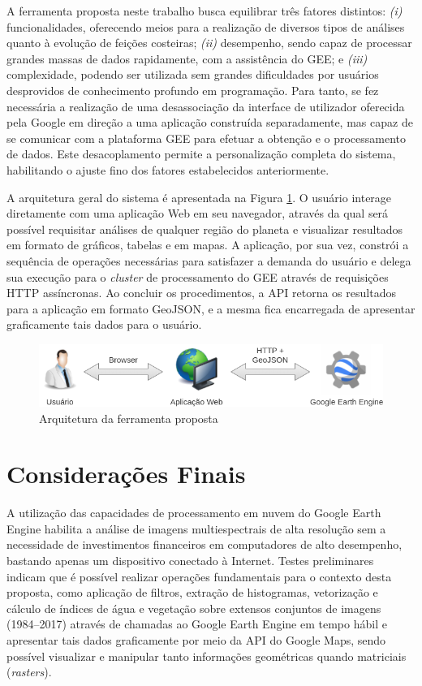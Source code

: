 \documentclass[12pt]{article}
\begin{document}
A ferramenta proposta neste trabalho busca equilibrar três fatores distintos: \textit{(i)} funcionalidades, oferecendo meios para a realização de diversos tipos de análises quanto à evolução de feições costeiras; \textit{(ii)} desempenho, sendo capaz de processar grandes massas de dados rapidamente, com a assistência do GEE; e \textit{(iii)} complexidade, podendo ser utilizada sem grandes dificuldades por usuários desprovidos de conhecimento profundo em programação. Para tanto, se fez necessária a realização de uma desassociação da interface de utilizador oferecida pela Google em direção a uma aplicação construída separadamente, mas capaz de se comunicar com a plataforma GEE para efetuar a obtenção e o processamento de dados. Este desacoplamento permite a personalização completa do sistema, habilitando o ajuste fino dos fatores estabelecidos anteriormente.

A arquitetura geral do sistema é apresentada na Figura \ref{fig:arch}. O usuário interage diretamente com uma aplicação Web em seu navegador, através da qual será possível requisitar análises de qualquer região do planeta e visualizar resultados em formato de gráficos, tabelas e em mapas. A aplicação, por sua vez, constrói a sequência de operações necessárias para satisfazer a demanda do usuário e delega sua execução para o \textit{cluster} de processamento do GEE através de requisições HTTP assíncronas. Ao concluir os procedimentos, a API retorna os resultados para a aplicação em formato GeoJSON, e a mesma fica encarregada de apresentar graficamente tais dados para o usuário.

\begin{figure}[ht]
  \vspace{0.1cm}
  \centering
  \includegraphics[width=.64\textwidth]{cassie.png}
  \vspace{0.05cm}
  \caption{Arquitetura da ferramenta proposta}
  \label{fig:arch}
\end{figure}

\section{Considerações Finais} \label{sec:discussion}

A utilização das capacidades de processamento em nuvem do Google Earth Engine habilita a análise de imagens multiespectrais de alta resolução sem a necessidade de investimentos financeiros em computadores de alto desempenho, bastando apenas um dispositivo conectado à Internet. Testes preliminares indicam que é possível realizar operações fundamentais para o contexto desta proposta, como aplicação de filtros, extração de histogramas, vetorização e cálculo de índices de água e vegetação sobre extensos conjuntos de imagens (1984--2017) através de chamadas ao Google Earth Engine em tempo hábil e apresentar tais dados graficamente por meio da API do Google Maps, sendo possível visualizar e manipular tanto informações geométricas quando matriciais (\textit{rasters}).



\end{document}
